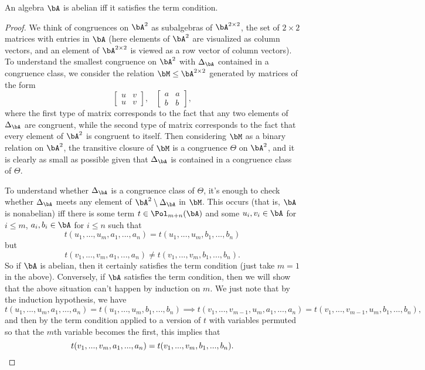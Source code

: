 \begin{prop} An algebra $\bA$ is abelian iff it satisfies the term condition.
\end{prop}
\begin{proof} We think of congruences on $\bA^2$ as subalgebras of $\bA^{2\times 2}$, the set of $2\times 2$ matrices with entries in $\bA$ (here elements of $\bA^2$ are visualized as column vectors, and an element of $\bA^{2\times 2}$ is viewed as a row vector of column vectors). To understand the smallest congruence on $\bA^2$ with $\Delta_\bA$ contained in a congruence class, we consider the relation $\bM \le \bA^{2\times 2}$ generated by matrices of the form
\[
\begin{bmatrix} u & v\\ u & v\end{bmatrix}, \;\;\; \begin{bmatrix} a & a\\ b & b\end{bmatrix},
\]
where the first type of matrix corresponds to the fact that any two elements of $\Delta_\bA$ are congruent, while the second type of matrix corresponds to the fact that every element of $\bA^2$ is congruent to itself. Then considering $\bM$ as a binary relation on $\bA^2$, the transitive closure of $\bM$ is a congruence $\Theta$ on $\bA^2$, and it is clearly as small as possible given that $\Delta_\bA$ is contained in a congruence class of $\Theta$.

To understand whether $\Delta_\bA$ is a congruence class of $\Theta$, it's enough to check whether $\Delta_\bA$ meets any element of $\bA^2 \setminus \Delta_\bA$ in $\bM$. This occurs (that is, $\bA$ is nonabelian) iff there is some term $t \in \Pol_{m+n}(\bA)$ and some $u_i,v_i \in \bA$ for $i \le m$, $a_i,b_i \in \bA$ for $i \le n$ such that
\[
t(u_1, ..., u_m, a_1, ..., a_n) = t(u_1, ..., u_m, b_1, ..., b_n)
\]
but
\[
t(v_1, ..., v_m, a_1, ..., a_n) \ne t(v_1, ..., v_m, b_1, ..., b_n).
\]
So if $\bA$ is abelian, then it certainly satisfies the term condition (just take $m=1$ in the above). Conversely, if $\bA$ satisfies the term condition, then we will show that the above situation can't happen by induction on $m$. We just note that by the induction hypothesis, we have
\[
t(u_1, ..., u_m, a_1, ..., a_n) = t(u_1, ..., u_m, b_1, ..., b_n) \implies t(v_1, ..., v_{m-1}, u_m, a_1, ..., a_n) = t(v_1, ..., v_{m-1}, u_m, b_1, ..., b_n),
\]
and then by the term condition applied to a version of $t$ with variables permuted so that the $m$th variable becomes the first, this implies that
\[
t(v_1, ..., v_m, a_1, ..., a_n) = t(v_1, ..., v_m, b_1, ..., b_n).\qedhere
\]
\end{proof}

